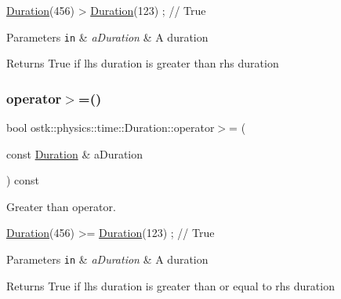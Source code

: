 \begin{DoxyCode}
\hyperlink{classostk_1_1physics_1_1time_1_1_duration_a6ba3a020742ca6e3bf0b1970dd039c07}{Duration}(456) > \hyperlink{classostk_1_1physics_1_1time_1_1_duration_a6ba3a020742ca6e3bf0b1970dd039c07}{Duration}(123) ; \textcolor{comment}{// True}
\end{DoxyCode}



\begin{DoxyParams}[1]{Parameters}
\mbox{\tt in}  & {\em a\+Duration} & A duration \\
\hline
\end{DoxyParams}
\begin{DoxyReturn}{Returns}
True if lhs duration is greater than rhs duration 
\end{DoxyReturn}
\mbox{\label{classostk_1_1physics_1_1time_1_1_duration_a3c742aac8e660effd3575fe0ca570d75}} 
\subsubsection{\texorpdfstring{operator$>$=()}{operator>=()}}
{\footnotesize\ttfamily bool ostk\+::physics\+::time\+::\+Duration\+::operator$>$= (\begin{DoxyParamCaption}\item[{const \hyperlink{classostk_1_1physics_1_1time_1_1_duration}{Duration} \&}]{a\+Duration }\end{DoxyParamCaption}) const}



Greater than operator. 


\begin{DoxyCode}
\hyperlink{classostk_1_1physics_1_1time_1_1_duration_a6ba3a020742ca6e3bf0b1970dd039c07}{Duration}(456) >= \hyperlink{classostk_1_1physics_1_1time_1_1_duration_a6ba3a020742ca6e3bf0b1970dd039c07}{Duration}(123) ; \textcolor{comment}{// True}
\end{DoxyCode}



\begin{DoxyParams}[1]{Parameters}
\mbox{\tt in}  & {\em a\+Duration} & A duration \\
\hline
\end{DoxyParams}
\begin{DoxyReturn}{Returns}
True if lhs duration is greater than or equal to rhs duration 
\end{DoxyReturn}
\mbox{\label{classostk_1_1physics_1_1time_1_1_duration_afe4136976a7c4e5c2ec00c0aa5583b18}} 
